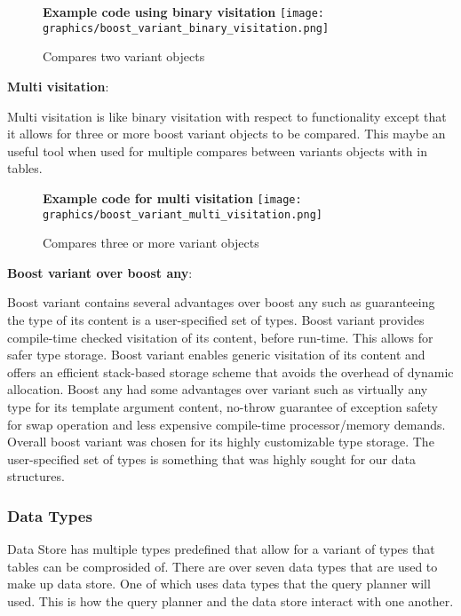 \documentclass[letterpaper, 12pt]{article}
\begin{document}
\begin{figure}
  \centering
  \textbf{Example code using binary visitation}
  \texttt{[image: graphics/boost\_variant\_binary\_visitation.png]}
  \cite{boostvariant}
  \caption{Compares two variant objects}
\end{figure}

\newpage
{\bfseries Multi visitation}:
\par\vspace{\baselineskip}
Multi visitation is like binary visitation with respect to functionality except that it allows for
three or more boost variant objects to be compared. This maybe an useful tool when used for
multiple compares between variants objects with in tables.

\begin{figure}
  \centering
  \textbf{Example code for multi visitation}
  \texttt{[image: graphics/boost\_variant\_multi\_visitation.png]}
  \cite{boostvariant}
  \caption{Compares three or more variant objects}
\end{figure}

\par\vspace{\baselineskip}
{\bfseries Boost variant over boost any}:
\par\vspace{\baselineskip}
Boost variant contains several advantages over boost any such as guaranteeing the type of its
content is a user-specified set of types. Boost variant provides compile-time checked
visitation of its content, before run-time. This allows for safer type storage. Boost variant
enables generic visitation of its content and offers an efficient stack-based storage scheme
that avoids the overhead of dynamic allocation. Boost any had some advantages over variant such
as virtually any type for its template argument content, no-throw guarantee of exception safety
for swap operation and less expensive compile-time processor/memory demands. Overall boost
variant was chosen for its highly customizable type storage. The user-specified set of types
is something that was highly sought for our data structures.
\par\vspace{\baselineskip}

\newpage
\subsubsection{Data Types}
	Data Store has multiple types predefined that allow for a variant of types that tables can be
	comprosided of. There are over seven data types that are used to make up data store. One of which
	uses data types that the query planner will used. This is how the query planner and the data store
	interact with one another.
	
\end{document}
